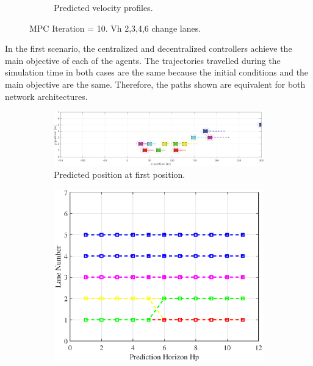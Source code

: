 \begin{figure}[h!]
\begin{subfigure}[b]{0.45\textwidth}
    \caption{Predicted velocity profiles.}
    \label{fig:third}
\end{subfigure}
\caption{MPC Iteration = 10. Vh 2,3,4,6 change lanes.}
\label{fig:figures}
\end{figure}

In the first scenario, the centralized and decentralized controllers achieve the main objective of each of the agents. The trajectories travelled during the simulation time in both cases are the same because the initial conditions and the main objective are the same. Therefore, the paths shown are equivalent for both network architectures.

\begin{figure}[H]
\centering
\begin{subfigure}[t]{\textwidth}
    \includegraphics[width=\textwidth]{Kap6/no_restricted/no_restricted_traj30.eps}
    \caption{Predicted position at first position.}
    \label{fig:first}
\end{subfigure}
\vspace{1cm}
\begin{subfigure}[b]{0.45\textwidth}
    \includegraphics[width=\textwidth]{Kap6/no_restricted/no_restricted_lane30.eps}

\end{subfigure}
\end{figure}
